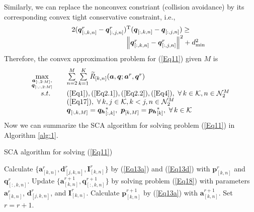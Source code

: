 \documentclass[10pt,final,conference]{IEEEtran}
\begin{document}
Similarly, we can replace the nonconvex constriant (collision avoidance) by its corresponding convex tight conservative constraint, i.e.,
\begin{equation}\label{Eq17}
	\begin{array}{c}
		2(\boldsymbol{q}^r_{[:,k,n]}-\boldsymbol{q}^r_{[:,j,n]})^{\rm T}(\boldsymbol{q}_{[:,k,n]}-\boldsymbol{q}_{[:,j,n]})\geq  \\
		\qquad\qquad\qquad\qquad\qquad\left\lVert\boldsymbol{q}^r_{[:,k,n]}-\boldsymbol{q}^r_{[:,j,n]}\right\rVert^2+d_{\min}^2
	\end{array}
\end{equation}
Therefore, the convex approximation problem for (\ref{Eq11}) given $M$ is
\begin{equation}\label{Eq18}
	\begin{array}{cll}
		\max\limits_{\substack{\boldsymbol{a}_{[:,2:M]},\\ \boldsymbol{q}_{[:,:,2:M]}}}\quad & \sum\limits_{n=2}^{M}\sum\limits_{k=1}^K \widetilde{R}_{[k,n]}(\boldsymbol{a},\boldsymbol{q};\boldsymbol{a}^r,\boldsymbol{q}^r) \\ 
		s.t.  & (\ref{Eq1}),(\ref{Eq2.1}),(\ref{Eq2.2}),(\ref{Eq4}),\ \forall\,k\in\mathcal{K},n\in\mathcal{N}_2^M \\
		& (\ref{Eq17}),\ \forall\,k,j\in\mathcal{K},k<j,n\in\mathcal{N}_2^M \\
		& \boldsymbol{q}_{[:,k,M]}=\boldsymbol{q_h}^*_{[:,k]},\   \boldsymbol{p}_{[k,M]} = \boldsymbol{p_h}^*_{[k]},\  \forall\,k\in\mathcal{K}
	\end{array}
\end{equation}
Now we can summarize the SCA algorithm for solving problem (\ref{Eq11}) in Algorithm \ref{alg:1}.
\begin{algorithm}[!htb]
	\caption{SCA algorithm for solving (\ref{Eq11})}
	\label{alg:1}
	\scriptsize
	\begin{algorithmic}[1]
		\REPEAT 
		\STATE Calculate $\{\boldsymbol{a}^r_{[k,n]},\boldsymbol{d}^r_{[j,k,n]},\boldsymbol{I}^r_{[k,n]}\}$ by (\ref{Eq13a}) and (\ref{Eq13d}) with $\boldsymbol{p}^r_{[k,n]}$ and $\boldsymbol{q}^r_{[:,k,n]}$.
		\STATE Update $\{\boldsymbol{a}^{r+1}_{[k,n]},\boldsymbol{q}^{r+1}_{[:,k,n]}\}$ by solving problem (\ref{Eq18}) with parameters $\boldsymbol{a}^r_{[k,n]}$, $\boldsymbol{d}^r_{[j,k,n]}$, and $\boldsymbol{I}^r_{[k,n]}$.
		\STATE Calculate $\boldsymbol{p}^{r+1}_{[k,n]}$ by (\ref{Eq13a}) with $\boldsymbol{a}^{r+1}_{[k,n]}$.
		\STATE Set $r=r+1$.
	\end{algorithmic}
\end{algorithm}
\end{document}
